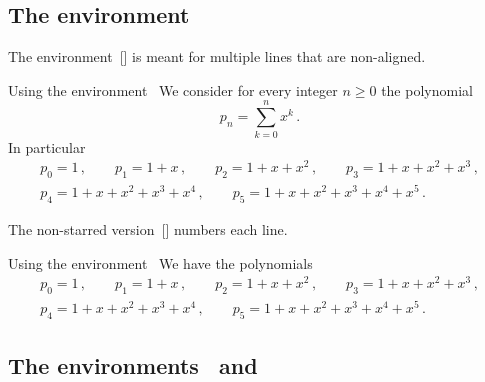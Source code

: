 \subsection{The environment~}

The environment~[\envname] is meant for multiple lines that are non-aligned.
\begin{showlatex}{Using the environment~}
We consider for every integer $n \geq 0$ the polynomial
\[
  p_n
  =
  \sum_{k=0}^n x^k \,.
\]
In particular
\begin{gather*}
  p_0 = 1 \,,
  \qquad
  p_1 = 1 + x \,,
  \qquad
  p_2 = 1 + x + x^2 \,,
  \qquad
  p_3 = 1 + x + x^2 + x^3 \,,
  \\
  p_4 = 1 + x + x^2 + x^3 + x^4 \,,
  \qquad
  p_5 = 1 + x + x^2 + x^3 + x^4 + x^5 \,.
\end{gather*}
\end{showlatex}
The non-starred version~[\envname] numbers each line.
\begin{showlatex}{Using the environment~}
We have the polynomials
\begin{gather}
  p_0 = 1 \,,
  \qquad
  p_1 = 1 + x \,,
  \qquad
  p_2 = 1 + x + x^2 \,,
  \qquad
  p_3 = 1 + x + x^2 + x^3 \,,
  \\
  p_4 = 1 + x + x^2 + x^3 + x^4 \,,
  \qquad
  p_5 = 1 + x + x^2 + x^3 + x^4 + x^5 \,.
\end{gather}
\end{showlatex}



\subsection{The environments~ and }

